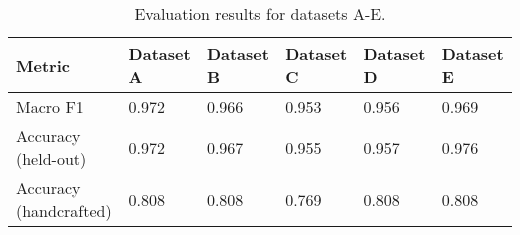 \begin{table}[h]
\centering
\begin{tabularx}{\textwidth}{lXXXXX}
\hline
Metric & Dataset A & Dataset B & Dataset C & Dataset D & Dataset E \\
\hline
Macro F1 & 0.972 & 0.966 & 0.953 & 0.956 & 0.969 \\
Accuracy (held-out) & 0.972 & 0.967 & 0.955 & 0.957 & 0.976 \\
Accuracy (handcrafted) & 0.808 & 0.808 & 0.769 & 0.808 & 0.808 \\
\hline
\end{tabularx}
\caption{Evaluation results for datasets A-E.}
\end{table}